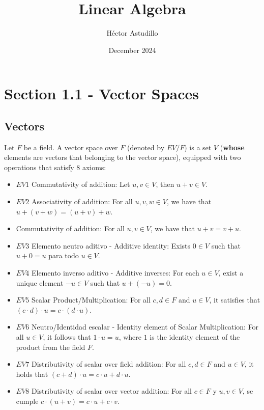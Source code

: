 \documentclass{article}
\title{Linear Algebra}
\author{Héctor Astudillo}
\date{December 2024}
\begin{document}
\maketitle

\section*{Section 1.1 - Vector Spaces}
\subsection*{Vectors}
Let \( F \) be a field. A vector space over \( F \) (denoted by \( EV/F \)) is a set \( V \) (\textbf{whose} elements are vectors that belonging to the vector space), equipped with two operations that satisfy 8 axioms:

\begin{itemize}
    \item \(EV1\) Commutativity of addition: 
    Let \( u, v \in V \), then \( u + v \in V \).
    \item \(EV2\) Associativity of addition:
    For all \( u, v, w \in V \), we have that \( u + (v + w) = (u + v) + w \).
    \item Commutativity of addition: 
    For all \( u, v \in V \), we have that \( u + v = v + u \).
    \item \(EV3\) Elemento neutro aditivo - Additive identity: 
    Exists \( 0 \in V \) such that \( u + 0 = u \) para todo \( u \in V \).
    \item \(EV4\) Elemento inverso aditivo - Additive inverses:
    For each \( u \in V \), exist a unique element \( -u \in V \) such that \( u + (-u) = 0 \).
    \item \(EV5\) Scalar Product/Multiplication: 
    For all \( c, d \in F \) and \( u \in V \), it satisfies that \( (c \cdot d) \cdot u = c \cdot (d \cdot u) \).
    \item \(EV6\) Neutro/Identidad escalar - Identity element of Scalar Multiplication: 
    For all \( u \in V \), it follows that \( 1 \cdot u = u \), where \( 1 \) is the identity element of the product from the field \( F \).
    \item \(EV7\) Distributivity of scalar over field addition: 
    For all \( c, d \in F \) and \( u \in V \), it holds that \( (c + d) \cdot u = c \cdot u + d \cdot u \).
    \item \(EV8\) Distributivity of scalar over vector addition: 
    For all \( c \in F \) y \( u, v \in V \), se cumple \( c \cdot (u + v) = c \cdot u + c \cdot v \).
\end{itemize}
\end{document}
